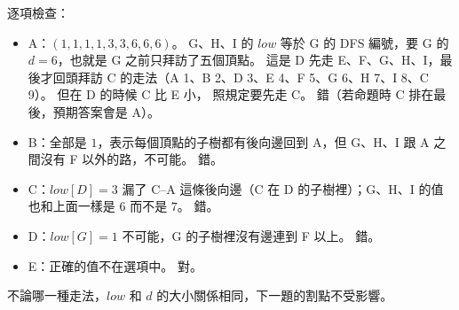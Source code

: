 \begin{pastsoln}
逐項檢查：
\begin{itemize}
\item A：$(1, 1, 1, 1, 3, 3, 6, 6, 6)$。 G、H、I 的 $\mathit{low}$ 等於 G 的 DFS 編號，要 G 的 $d = 6$，也就是 G 之前只拜訪了五個頂點。
這是 D 先走 E、F、G、H、I，最後才回頭拜訪 C 的走法（A 1、B 2、D 3、E 4、F 5、G 6、H 7、I 8、C 9）。 但在 D 的時候 C 比 E 小，
照規定要先走 C。 錯（若命題時 C 排在最後，預期答案會是 A）。
\item B：全部是 $1$，表示每個頂點的子樹都有後向邊回到 A，但 G、H、I 跟 A 之間沒有 F 以外的路，不可能。 錯。
\item C：$\mathit{low}[D] = 3$ 漏了 C--A 這條後向邊（C 在 D 的子樹裡）；G、H、I 的值也和上面一樣是 $6$ 而不是 $7$。 錯。
\item D：$\mathit{low}[G] = 1$ 不可能，G 的子樹裡沒有邊連到 F 以上。 錯。
\item E：正確的值不在選項中。 對。
\end{itemize}
不論哪一種走法，$\mathit{low}$ 和 $d$ 的大小關係相同，下一題的割點不受影響。
\end{pastsoln}
